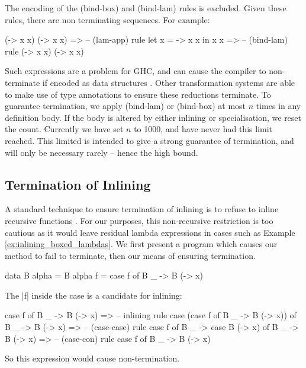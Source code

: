 \documentclass[preprint]{sigplanconf}
\begin{document}
The encoding of the (bind-box) and (bind-lam) rules is excluded. Given these rules, there are non terminating sequences. For example:

\ignore\begin{code}
(\x -> x x) (\x -> x x)
   => -- (lam-app) rule
let x = \x -> x x in x x
   => -- (bind-lam) rule
(\x -> x x) (\x -> x x)
\end{code}

Such expressions are a problem for GHC, and can cause the compiler to non-terminate if encoded as data structures \cite{spj:inlining}. Other transformation systems \cite{chin:higher_order_removal} are able to make use of type annotations to ensure these reductions terminate. To guarantee termination, we apply (bind-lam) or (bind-box) at most $n$ times in any definition body. If the body is altered by either inlining or specialisation, we reset the count. Currently we have set $n$ to 1000, and have never had this limit reached. This limited is intended to give a strong guarantee of termination, and will only be necessary rarely -- hence the high bound.

\subsection{Termination of Inlining}

A standard technique to ensure termination of inlining is to refuse to inline recursive functions \cite{spj:inlining}. For our purposes, this non-recursive restriction is too cautious as it would leave residual lambda expressions in cases such as Example \ref{ex:inlining_boxed_lambdas}. We first present a program which causes our method to fail to terminate, then our means of ensuring termination.

\begin{example}
\begin{code}
data B alpha = B alpha
f = case  f of
          B _ -> B (\x -> x)
\end{code}

The |f| inside the case is a candidate for inlining:

\ignore\begin{code}
case f of B _ -> B (\x -> x)
    => -- inlining rule
case (case f of B _ -> B (\x -> x)) of B _ -> B (\x -> x)
    => -- (case-case) rule
case f of B _ -> case B (\x -> x) of B _ -> B (\x -> x)
    => -- (case-con) rule
case f of B _ -> B (\x -> x)
\end{code}

\noindent So this expression would cause non-termination.
\end{example}
\end{document}
